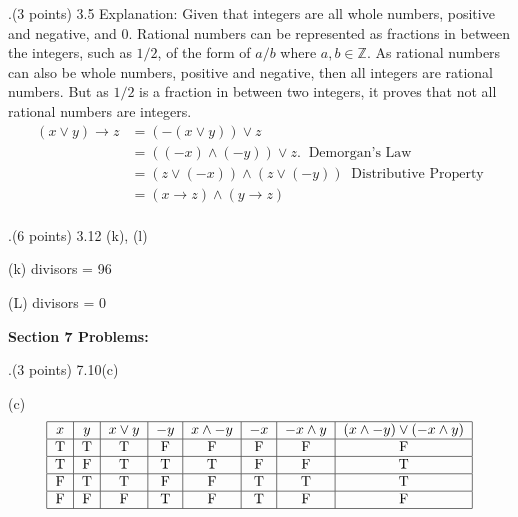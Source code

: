 \documentclass[12pt]{article}
\begin{document}
.(3 points) 3.5
\vspace{.15in}
\newline
Explanation: Given that integers are all whole numbers, positive and negative, and 0. Rational numbers can be represented as fractions in between the integers, such as $1/2$, of the form of $a/b$ where $a,b \in \mathbb{Z}$. As rational numbers can also be whole numbers, positive and negative, then all integers are rational numbers. But as $1/2$ is a fraction in between two integers, it proves that not all rational numbers are integers. 
\[
\begin{aligned} %
(x \vee y) \rightarrow z &= (-(x \vee y) ) \vee z \\
&= ( (-x) \wedge (- y) ) \vee z.  \;\;  \mbox{Demorgan's Law} \\ %
&= (z \vee (-x)) \wedge (z \vee (-y)) \;\; \mbox{Distributive Property} \\
&= (x \rightarrow z) \wedge (y \rightarrow z) \\
\end{aligned}
\]

.(6 points) 3.12  (k), (l)
\vspace{.25in}

(k) divisors = 96

(L) divisors = 0 

\vspace{.25in}



\noindent \textbf{Section 7 Problems:} 
\vspace{.15in}

.(3 points) 7.10(c)    
\vspace{.15in}

(c) 
\[ %
\begin{tabular}{|c|c|c|c|c|c|c|c|} 
\hline %
$x$ & $y$ & $x\vee y$ & $-y$ & $x\wedge -y$ & $-x$ & $-x\wedge y$ & $(x \wedge -y) \vee (-x \wedge y)$ \\ 
\hline
T&T&T&F&F&F&F&F \\
\hline 
T&F&T&T&T&F&F&T\\
\hline
F&T&T&F&F&T&T&T\\
\hline
F&F&F&T&F&T&F&F \\
\hline
\end{tabular} %
\] %
\end{document}
